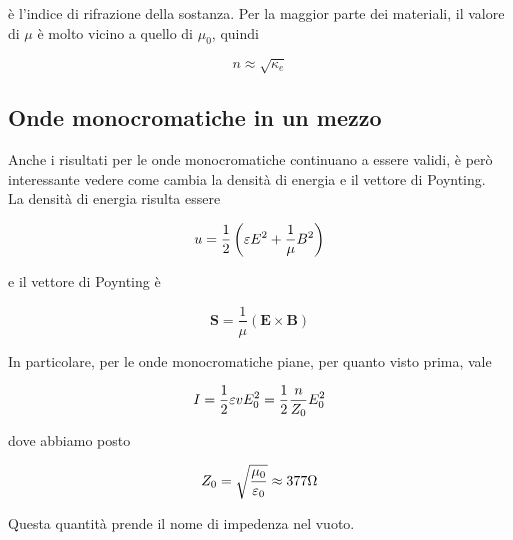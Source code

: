 è l'indice di rifrazione della sostanza. Per la maggior parte dei materiali, il valore di $\mu$ è molto vicino a quello di $\mu_0$, quindi

\begin{equation}
    n \approx\sqrt{\kappa_e}
\end{equation}

\subsection{Onde monocromatiche in un mezzo}

Anche i risultati per le onde monocromatiche continuano a essere validi, è però interessante vedere come cambia la densità di energia e il vettore di Poynting. \\

La densità di energia risulta essere 

\begin{equation}
    u = \frac{1}{2} \left( \varepsilon E^2 + \frac{1}{\mu} B^2 \right)
\end{equation}

e il vettore di Poynting è 

\begin{equation}
    \mathbf{S} = \frac{1}{\mu} (\mathbf{E} \times \mathbf{B})
\end{equation}

In particolare, per le onde monocromatiche piane, per quanto visto prima, vale 

\begin{tcolorbox}[colback=yellow!10!white, colframe=orange!70!black, boxrule=0.8pt]
\begin{equation}
    I = \frac{1}{2} \varepsilon v E_0^2 = \frac{1}{2} \frac{n}{Z_0} E_0^2
\end{equation}
\end{tcolorbox}

dove abbiamo posto 

\begin{tcolorbox}[colback=yellow!10!white, colframe=orange!70!black, boxrule=0.8pt]
\begin{equation}
    Z_0 = \sqrt{\frac{\mu_0}{\varepsilon_0}} \approx 377 \Omega
\end{equation}
\end{tcolorbox}

Questa quantità prende il nome di impedenza nel vuoto. 

\newpage

